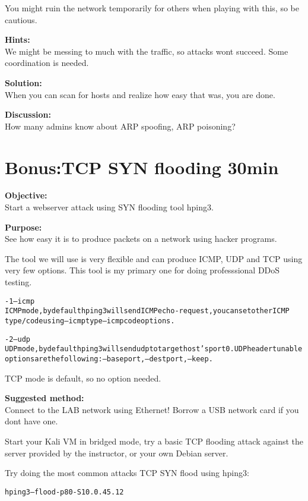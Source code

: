 \documentclass[a4paper,11pt,notitlepage]{report}
\begin{document}
You might ruin the network temporarily for others when playing with this, so be cautious.

{\bf Hints:}\\
We might be messing to much with the traffic, so attacks wont succeed. Some coordination is needed.

{\bf Solution:}\\
When you can scan for hosts and realize how easy that was, you are done.

{\bf Discussion:}\\
How many admins know about ARP spoofing, ARP poisoning?


\chapter{Bonus:TCP SYN flooding 30min}
\label{ex:syn-flood}

{\bf Objective:}\\
Start a webserver attack using SYN flooding tool hping3.

{\bf Purpose:}\\
See how easy it is to produce packets on a network using hacker programs.

The tool we will use is very flexible and can produce ICMP, UDP and TCP using very few options. This tool is my primary one for doing professsional DDoS testing.

\begin{alltt}\footnotesize
-1 --icmp
       ICMP  mode,  by  default  hping3  will  send  ICMP echo-request, you can set other ICMP
       type/code using --icmptype --icmpcode options.

-2 --udp
       UDP mode, by default hping3 will send udp to target host's port 0.  UDP header  tunable
       options are the following: --baseport, --destport, --keep.
\end{alltt}

TCP mode is default, so no option needed.


{\bf Suggested method:}\\
Connect to the LAB network using Ethernet! Borrow a USB network card if you dont have one.

Start your Kali VM in bridged mode, try a basic TCP flooding attack against the server provided by the instructor, or your own Debian server.

Try doing the most common attacks TCP SYN flood using hping3:

\begin{alltt}
hping3 --flood -p 80 -S 10.0.45.12
\end{alltt}
\end{document}
